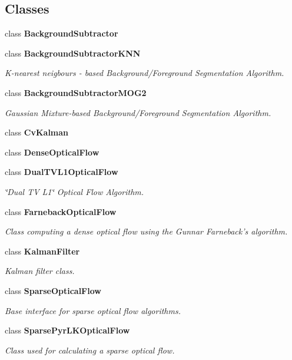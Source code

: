 \subsection*{Classes}
\begin{DoxyCompactItemize}
\item 
class {\bfseries Background\+Subtractor}
\item 
class {\bfseries Background\+Subtractor\+K\+NN}
\begin{DoxyCompactList}\small\item\em K-\/nearest neigbours -\/ based Background/\+Foreground Segmentation Algorithm. \end{DoxyCompactList}\item 
class {\bfseries Background\+Subtractor\+M\+O\+G2}
\begin{DoxyCompactList}\small\item\em Gaussian Mixture-\/based Background/\+Foreground Segmentation Algorithm. \end{DoxyCompactList}\item 
class {\bfseries Cv\+Kalman}
\item 
class {\bfseries Dense\+Optical\+Flow}
\item 
class {\bfseries Dual\+T\+V\+L1\+Optical\+Flow}
\begin{DoxyCompactList}\small\item\em \char`\"{}\+Dual T\+V L1\char`\"{} Optical Flow Algorithm. \end{DoxyCompactList}\item 
class {\bfseries Farneback\+Optical\+Flow}
\begin{DoxyCompactList}\small\item\em Class computing a dense optical flow using the Gunnar Farneback’s algorithm. \end{DoxyCompactList}\item 
class {\bfseries Kalman\+Filter}
\begin{DoxyCompactList}\small\item\em Kalman filter class. \end{DoxyCompactList}\item 
class {\bfseries Sparse\+Optical\+Flow}
\begin{DoxyCompactList}\small\item\em Base interface for sparse optical flow algorithms. \end{DoxyCompactList}\item 
class {\bfseries Sparse\+Pyr\+L\+K\+Optical\+Flow}
\begin{DoxyCompactList}\small\item\em Class used for calculating a sparse optical flow. \end{DoxyCompactList}\end{DoxyCompactItemize}
